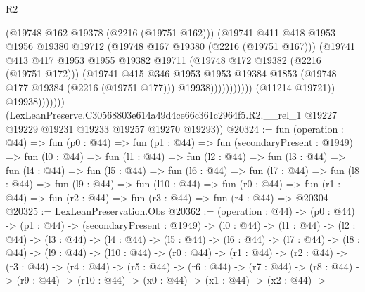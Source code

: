 \begin{lexlean}{R2}
\begin{coremodule}
                                      (@19748 @162 @19378 (@2216 (@19751 @162)))
                                      (@19741
                                        @411
                                        @418
                                        @1953
                                        @1956
                                        @19380
                                        @19712
                                        (@19748 @167 @19380 (@2216 (@19751 @167)))
                                        (@19741
                                          @413
                                          @417
                                          @1953
                                          @1955
                                          @19382
                                          @19711
                                          (@19748 @172 @19382 (@2216 (@19751 @172)))
                                          (@19741
                                            @415
                                            @346
                                            @1953
                                            @1953
                                            @19384
                                            @1853
                                            (@19748 @177 @19384 (@2216 (@19751 @177)))
                                            @19938)))))))))))
                      (@11214 @19721))
                    @19938)))))))
      (LexLeanPreserve.C30568803e614a49d4ce66c361c2964f5.R2.__rel_1
        @19227
        @19229
        @19231
        @19233
        @19257
        @19270
        @19293))
@20324 := fun (operation : @44) =>
  fun (p0 : @44) =>
  fun (p1 : @44) =>
  fun (secondaryPresent : @1949) =>
  fun (l0 : @44) =>
  fun (l1 : @44) =>
  fun (l2 : @44) =>
  fun (l3 : @44) =>
  fun (l4 : @44) =>
  fun (l5 : @44) =>
  fun (l6 : @44) =>
  fun (l7 : @44) =>
  fun (l8 : @44) =>
  fun (l9 : @44) =>
  fun (l10 : @44) =>
  fun (r0 : @44) => fun (r1 : @44) => fun (r2 : @44) => fun (r3 : @44) => fun (r4 : @44) => @20304
@20325 := LexLeanPreservation.Obs
@20362 := (operation : @44) ->
  (p0 : @44) ->
  (p1 : @44) ->
  (secondaryPresent : @1949) ->
  (l0 : @44) ->
  (l1 : @44) ->
  (l2 : @44) ->
  (l3 : @44) ->
  (l4 : @44) ->
  (l5 : @44) ->
  (l6 : @44) ->
  (l7 : @44) ->
  (l8 : @44) ->
  (l9 : @44) ->
  (l10 : @44) ->
  (r0 : @44) ->
  (r1 : @44) ->
  (r2 : @44) ->
  (r3 : @44) ->
  (r4 : @44) ->
  (r5 : @44) ->
  (r6 : @44) ->
  (r7 : @44) ->
  (r8 : @44) ->
  (r9 : @44) ->
  (r10 : @44) ->
  (x0 : @44) ->
  (x1 : @44) ->
  (x2 : @44) ->

\end{coremodule}
\end{lexlean}
